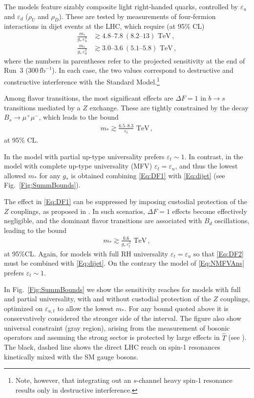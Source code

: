 \documentclass[aps,prl,twocolumn,showpacs,10pt,preprintnumbers,nofootinbib]{revtex4-2}
\newcommand{\TeV}{\,\mathrm{TeV}}
\newcommand{\gst}{g_*}
\newcommand{\mst}{m_*}
\newcommand{\eu}{\varepsilon_{u}}
\newcommand{\et}{\varepsilon_{t}}
\newcommand{\ed}{\varepsilon_{d}}
\begin{document}
{The models feature sizably composite light right-handed quarks, controlled by $\eu$ and $\ed$ ($\rho_{U}$ and $\rho_D$). These are tested by measurements of four-fermion interactions in dijet events at the LHC, which require (at 95\% CL)
\begin{align}\label{Eq:dijet}
    \frac{m_*}{\gst\, \eu^2} &\gtrsim 4.8\text{--}7.8\ (8.2\text{--}13)\,\TeV\,, \\
    \frac{m_*}{\gst\, \ed^2} &\gtrsim 3.0\text{--}3.6\ (5.1\text{--}5.8)\,\TeV\,,
\end{align}
where the numbers in parentheses refer to the projected sensitivity at the end of Run~3 ($300\,\text{fb}^{-1}$). In each case, the two values correspond to destructive and constructive interference with the Standard Model.\footnote{Note, however, that integrating out an $s$-channel heavy spin-1 resonance results only in destructive interference.}

Among flavor transitions, the most significant effects are $\Delta F = 1$ in $b \rightarrow s$ transitions mediated by a $Z$ exchange. These are tightly constrained by the decay $B_s \rightarrow \mu^+ \mu^-$, which leads to the bound 
\begin{align}\label{Eq:DF1}
    m_* \gtrsim \frac{6.5\text{--}8.3}{\et}\,\TeV\,,
\end{align}
at 95\% CL.

In the model with partial up-type universality prefers $\et\sim 1$. In contrast, in the model with complete up-type universality (MFV) $\et = \eu$, and thus the lowest allowed $\mst$ for any $\gst$ is obtained combining \eqref{Eq:DF1} with \eqref{Eq:dijet} (see Fig.~\ref{Fig:SummBounds}).

The effect in \eqref{Eq:DF1} can be suppressed by imposing custodial protection of the $Z$ couplings, as proposed in \cite{Agashe:2006at}. In such scenarios, $\Delta F = 1$ effects become effectively negligible, and the dominant flavor transitions are associated with $B_d$ oscillations, leading to the bound
\begin{align}\label{Eq:DF2}
    m_* \gtrsim \frac{6.6}{\gst\, \varepsilon_{t}^2}\,\TeV\,,
\end{align}
at 95\%CL.
Again, for models with full RH universality $\et=\eu$ so that \eqref{Eq:DF2} must be combined with \eqref{Eq:dijet}. On the contrary the model of \eqref{Eq:NMFVAns} prefers $\et\sim1$. 


In Fig.~\ref{Fig:SummBounds} we show the sensitivity reaches for models with full and partial universality, with and without custodial protection of the $Z$ couplings, optimized on $\varepsilon_{u,t}$ to allow the lowest $\mst$. For any bound quoted above it is conservatively considered the stronger side of the interval. The figure also show universal constraint (gray region), arising from the measurement of bosonic operators and assuming the strong sector is protected by large effects in $\hat{T}$ (see \cite{Agashe:2003zs}). The black, dashed line shows the direct LHC reach on spin-1 resonances kinetically mixed with the SM gauge bosons.

}
\end{document}

